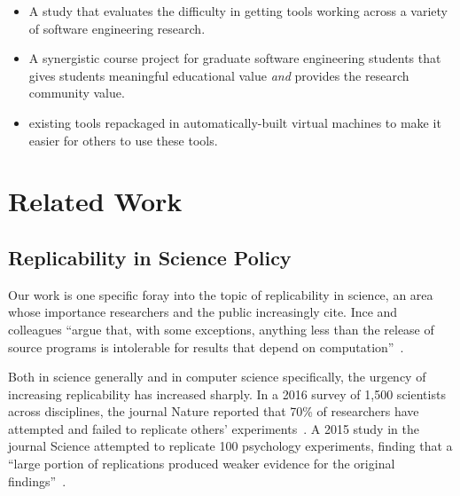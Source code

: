 \documentclass[10pt,conference]{IEEEtran}
\begin{document}
\begin{itemize}
  \item A study that evaluates the difficulty in getting \totalToolsTried tools 
  		working across a variety of software engineering research.
  \item A synergistic course project for graduate software engineering students 
		that gives students meaningful educational value \emph{and}
		provides the research community value.
  \item \permissionToRedistribute existing tools repackaged in automatically-built virtual machines
  		to make it easier for others to use these tools.
\end{itemize}

\section{Related Work}


\subsection{Replicability in Science Policy}


Our work is one specific foray into the topic of replicability
in science, an area whose importance researchers and the public 
increasingly cite.
Ince and colleagues ``argue that, with some exceptions, anything less 
than the release of source programs is intolerable for 
results that depend on computation''~\cite{ince2012case}.

Both in science generally and in computer science specifically,
the urgency of increasing replicability has increased sharply.
In a 2016 survey of 1,500 scientists across disciplines, the journal
Nature reported that 70\% of researchers have attempted
and failed to replicate others' experiments~\cite{baker20161}.
A 2015 study in the journal Science 
attempted to replicate 100 psychology experiments,
finding that a ``large portion of replications produced weaker evidence for the original findings''~\cite{open2015estimating}.
\end{document}
